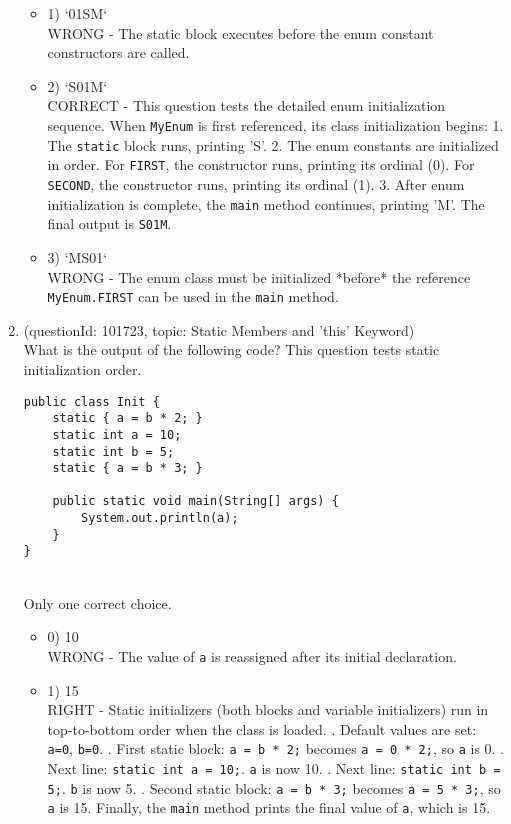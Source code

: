 \documentclass[12pt]{article}
\begin{document}
\begin{enumerate}[label=(\arabic*)]
\begin{itemize}
\item 1) `01SM`
 \\ 
WRONG - The static block executes before the enum constant constructors are called.

\item 2) `S01M`
 \\ 
CORRECT - This question tests the detailed enum initialization sequence. When \verb|MyEnum| is first referenced, its class initialization begins: 1. The \verb|static| block runs, printing 'S'. 2. The enum constants are initialized in order. For \verb|FIRST|, the constructor runs, printing its ordinal (0). For \verb|SECOND|, the constructor runs, printing its ordinal (1). 3. After enum initialization is complete, the \verb|main| method continues, printing 'M'. The final output is \verb|S01M|.

\item 3) `MS01`
 \\ 
WRONG - The enum class must be initialized *before* the reference \verb|MyEnum.FIRST| can be used in the \verb|main| method.

\end{itemize}
\item (questionId: 101723, topic: Static Members and 'this' Keyword) \\ 
What is the output of the following code? This question tests static initialization order.\n\begin{verbatim}
public class Init {
    static { a = b * 2; }
    static int a = 10;
    static int b = 5;
    static { a = b * 3; }

    public static void main(String[] args) {
        System.out.println(a);
    }
}
\end{verbatim}
\\ \noindent Only one correct choice. 
\begin{itemize}
\item 0) 10
 \\ 
WRONG - The value of \verb|a| is reassigned after its initial declaration.

\item 1) 15
 \\ 
RIGHT - Static initializers (both blocks and variable initializers) run in top-to-bottom order when the class is loaded. . Default values are set: \verb|a=0|, \verb|b=0|. . First static block: \verb|a = b * 2;| becomes \verb|a = 0 * 2;|, so \verb|a| is 0. . Next line: \verb|static int a = 10;|. \verb|a| is now 10. . Next line: \verb|static int b = 5;|. \verb|b| is now 5. . Second static block: \verb|a = b * 3;| becomes \verb|a = 5 * 3;|, so \verb|a| is 15. \newline Finally, the \verb|main| method prints the final value of \verb|a|, which is 15.


\end{itemize}
\end{enumerate}
\end{document}
